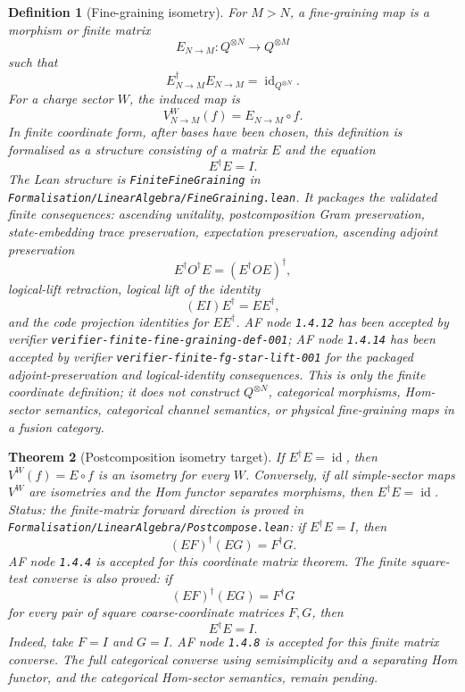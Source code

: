 \documentclass[11pt]{article}
\newtheorem{definition}{Definition}[section]
\newtheorem{theorem}[definition]{Theorem}
\begin{document}
\begin{definition}[Fine-graining isometry]
For \(M>N\), a fine-graining map is a morphism or finite matrix
\[
E_{N\to M}:Q^{\otimes N}\to Q^{\otimes M}
\]
such that
\[
E_{N\to M}^{\dagger}E_{N\to M}=\operatorname{id}_{Q^{\otimes N}}.
\]
For a charge sector \(W\), the induced map is
\[
V_{N\to M}^W(f)=E_{N\to M}\circ f.
\]
In finite coordinate form, after bases have been chosen, this definition is
formalised as a structure consisting of a matrix \(E\) and the equation
\[
E^\dagger E=I.
\]
The Lean structure is \texttt{FiniteFineGraining} in
\texttt{Formalisation/LinearAlgebra/FineGraining.lean}. It packages the
validated finite consequences: ascending unitality, postcomposition Gram
preservation, state-embedding trace preservation, expectation preservation,
ascending adjoint preservation
\[
E^\dagger O^\dagger E=(E^\dagger O E)^\dagger,
\]
logical-lift retraction, logical lift of the identity
\[
(E I)E^\dagger=EE^\dagger,
\]
and the code projection identities for \(EE^\dagger\). AF node \texttt{1.4.12}
has been accepted by verifier
\texttt{verifier-finite-fine-graining-def-001}; AF node \texttt{1.4.14} has
been accepted by verifier \texttt{verifier-finite-fg-star-lift-001} for the
packaged adjoint-preservation and logical-identity consequences. This is only
the finite coordinate definition; it does not construct \(Q^{\otimes N}\),
categorical morphisms, Hom-sector semantics, categorical channel semantics, or
physical fine-graining maps in a fusion category.
\end{definition}

\begin{theorem}[Postcomposition isometry target]
If \(E^\dagger E=\operatorname{id}\), then
\(V^W(f)=E\circ f\) is an isometry for every \(W\). Conversely, if all
simple-sector maps \(V^W\) are isometries and the Hom functor separates
morphisms, then \(E^\dagger E=\operatorname{id}\). Status: the finite-matrix
forward direction is proved in
\texttt{Formalisation/LinearAlgebra/Postcompose.lean}: if \(E^\dagger E=I\),
then
\[
(EF)^\dagger(EG)=F^\dagger G.
\]
AF node \texttt{1.4.4} is accepted for this coordinate matrix theorem.
The finite square-test converse is also proved: if
\[
(EF)^\dagger(EG)=F^\dagger G
\]
for every pair of square coarse-coordinate matrices \(F,G\), then
\[
E^\dagger E=I.
\]
Indeed, take \(F=I\) and \(G=I\). AF node \texttt{1.4.8} is accepted for
this finite matrix converse. The full categorical converse using
semisimplicity and a separating Hom functor, and the categorical Hom-sector
semantics, remain pending.
\end{theorem}
\end{document}
